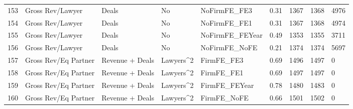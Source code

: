 \documentclass{article}
\begin{document}
\begin{table}[H]
\begin{tabular}{rllllllll}
  153 & Gross Rev/Lawyer & Deals & No & NoFirmFE\_FE3 & 0.31 & 1367 & 1368 & 4976 \\ 
  154 & Gross Rev/Lawyer & Deals & No & NoFirmFE\_FE1 & 0.31 & 1367 & 1368 & 4974 \\ 
  155 & Gross Rev/Lawyer & Deals & No & NoFirmFE\_FEYear & 0.49 & 1353 & 1355 & 3711 \\ 
  156 & Gross Rev/Lawyer & Deals & No & NoFirmFE\_NoFE & 0.21 & 1374 & 1374 & 5697 \\ 
  157 & Gross Rev/Eq Partner & Revenue + Deals & Lawyers^2 & FirmFE\_FE3 & 0.69 & 1496 & 1497 & 0 \\ 
  158 & Gross Rev/Eq Partner & Revenue + Deals & Lawyers^2 & FirmFE\_FE1 & 0.69 & 1497 & 1497 & 0 \\ 
  159 & Gross Rev/Eq Partner & Revenue + Deals & Lawyers^2 & FirmFE\_FEYear & 0.78 & 1480 & 1483 & 0 \\ 
  160 & Gross Rev/Eq Partner & Revenue + Deals & Lawyers^2 & FirmFE\_NoFE & 0.66 & 1501 & 1502 & 0 \\ 
   \hline
\end{tabular}
\end{table}
\end{document}
